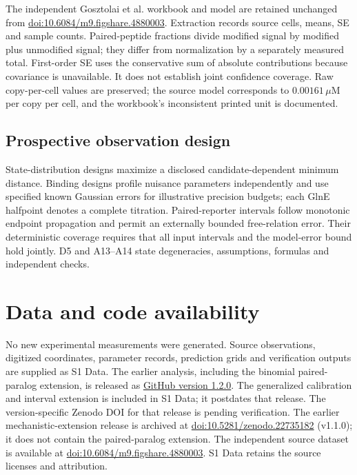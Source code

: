 \documentclass[10pt,letterpaper]{article}
\begin{document}
The independent Gosztolai et al. workbook and model are retained unchanged from \href{https://doi.org/10.6084/m9.figshare.4880003}{doi:10.6084/m9.figshare.4880003}. Extraction records source cells, means, SE and sample counts. Paired-peptide fractions divide modified signal by modified plus unmodified signal; they differ from normalization by a separately measured total. First-order SE uses the conservative sum of absolute contributions because covariance is unavailable. It does not establish joint confidence coverage. Raw copy-per-cell values are preserved; the source model corresponds to $0.00161\,\mu$M per copy per cell, and the workbook's inconsistent printed unit is documented.

\subsection*{Prospective observation design}

State-distribution designs maximize a disclosed candidate-dependent minimum distance. Binding designs profile nuisance parameters independently and use specified known Gaussian errors for illustrative precision budgets; each GlnE halfpoint denotes a complete titration. Paired-reporter intervals follow monotonic endpoint propagation and permit an externally bounded free-relation error. Their deterministic coverage requires that all input intervals and the model-error bound hold jointly. D5 and A13--A14 state degeneracies, assumptions, formulas and independent checks.

\section*{Data and code availability}

No new experimental measurements were generated. Source observations, digitized coordinates, parameter records, prediction grids and verification outputs are supplied as S1 Data. The earlier analysis, including the binomial paired-paralog extension, is released as \href{https://github.com/choeyule-gif/nitrogen-signaling-ultrasensitivity/releases/tag/v1.2.0}{GitHub version 1.2.0}. The generalized calibration and interval extension is included in S1 Data; it postdates that release. The version-specific Zenodo DOI for that release is pending verification. The earlier mechanistic-extension release is archived at \href{https://doi.org/10.5281/zenodo.22735182}{doi:10.5281/zenodo.22735182} (v1.1.0); it does not contain the paired-paralog extension. The independent source dataset is available at \href{https://doi.org/10.6084/m9.figshare.4880003}{doi:10.6084/m9.figshare.4880003}. S1 Data retains the source licenses and attribution.
\end{document}
